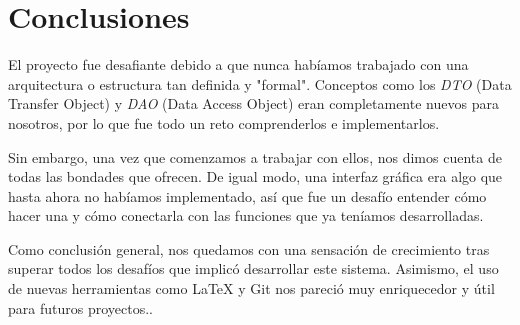 \section*{Conclusiones}

El proyecto fue desafiante debido a que nunca habíamos trabajado con una arquitectura o estructura tan definida y "formal". Conceptos como los \textit{DTO} (Data Transfer Object) y \textit{DAO} (Data Access Object) eran completamente nuevos para nosotros, por lo que fue todo un reto comprenderlos e implementarlos.

Sin embargo, una vez que comenzamos a trabajar con ellos, nos dimos cuenta de todas las bondades que ofrecen. De igual modo, una interfaz gráfica era algo que hasta ahora no habíamos implementado, así que fue un desafío entender cómo hacer una y cómo conectarla con las funciones que ya teníamos desarrolladas.

Como conclusión general, nos quedamos con una sensación de crecimiento tras superar todos los desafíos que implicó desarrollar este sistema. Asimismo, el uso de nuevas herramientas como \LaTeX{} y Git nos pareció muy enriquecedor y útil para futuros proyectos..
